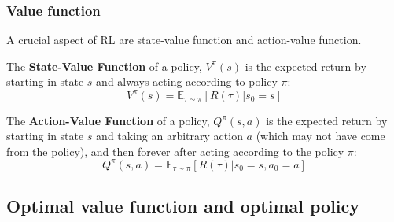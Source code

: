 \documentclass[10pt]{beamer}
\newcommand{\E}{{\mathbb E}}
\begin{document}
\begin{frame}

	\frametitle{Value function}

		A crucial aspect of RL are state-value function and action-value function.

		\begin{definition}
			The \textbf{State-Value Function} of a policy, $V^{\pi}(s)$ is the expected return by starting in state $s$ and always acting according to policy $\pi$:
			\begin{equation}
				V^{\pi}(s) = \E_{\tau \sim \pi} [R(\tau)| s_0 = s]
			\end{equation}
		\end{definition}

		\begin{definition}
			The \textbf{Action-Value Function} of a policy, $Q^{\pi}(s,a)$ is the expected return by starting in state $s$ and taking an arbitrary action $a$ (which may not have come from the policy), and then forever after acting according to the policy $\pi$:
			\begin{equation}
					Q^{\pi}(s,a) = \E_{\tau \sim \pi}[R(\tau)| s_0 = s, a_0 = a]	
			\end{equation}
			
		\end{definition}
	
\end{frame}


\subsection{Optimal value function and optimal policy }
\end{document}
